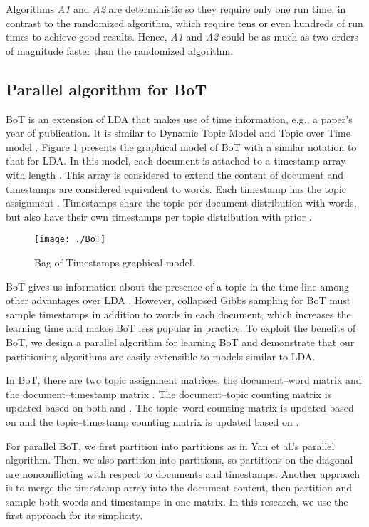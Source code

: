 \documentclass[10pt,conference]{IEEEtran}
\begin{document}
Algorithms \textit{A1} and \textit{A2} are deterministic so they require only one run time, in contrast to the randomized algorithm, which require tens or even hundreds of run times to achieve good results. Hence, \textit{A1} and \textit{A2} could be as much as two orders of magnitude faster than the randomized algorithm.

\subsection{Parallel algorithm for BoT}
BoT is an extension of LDA that makes use of time information, e.g., a paper's year of publication. It is similar to Dynamic Topic Model \cite{blei2006dynamic} and Topic over Time model \cite{wang2006topics}. Figure \ref{fig:BoT} presents the graphical model of BoT with a similar notation to that for LDA. In this model, each document  is attached to a timestamp array  with length . This array is considered to extend the content of document  and timestamps are considered equivalent to words. Each timestamp  has the topic assignment . Timestamps share the topic per document distribution  with words, but also have their own timestamps per topic distribution  with prior  \cite{masada2009bag}.
\begin{figure}[h]
\centering
\texttt{[image: ./BoT]}
\caption{Bag of Timestamps graphical model.}
\label{fig:BoT}
\end{figure}

BoT gives us information about the presence of a topic in the time line among other advantages over LDA \cite{masada2009bag}. However, collapsed Gibbs sampling for BoT must sample timestamps in addition to words in each document, which increases the learning time and makes BoT less popular in practice. To exploit the benefits of BoT, we design a parallel algorithm for learning BoT and demonstrate that our partitioning algorithms are easily extensible to models similar to LDA.

In BoT, there are two topic assignment matrices, the document--word matrix  and the document--timestamp matrix . The document--topic counting matrix  is updated based on both  and . The topic--word counting matrix  is updated based on  and the topic--timestamp counting matrix  is updated based on .

For parallel BoT, we first partition  into  partitions as in Yan et al.'s parallel algorithm. Then, we also partition  into  partitions, so partitions on the diagonal are nonconflicting with respect to documents and timestamps. Another approach is to merge the timestamp array into the document content, then partition and sample both words and timestamps in one matrix. In this research, we use the first approach for its simplicity.
\end{document}
